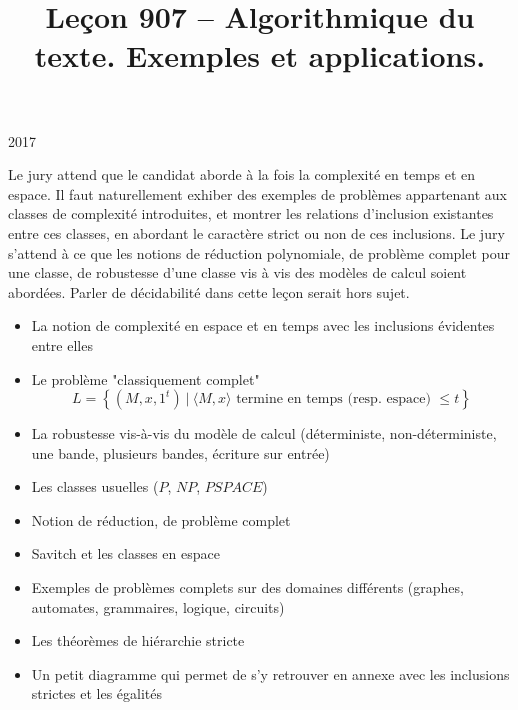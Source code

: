\documentclass{agregfiche}
\title{Leçon 907 -- Algorithmique du texte. Exemples et applications.}
\begin{document}
\maketitle

\secrapports

\begin{rapport}{2017}

Le jury attend que le candidat aborde à la fois la complexité en temps et en
espace. Il faut naturellement exhiber des exemples de problèmes appartenant aux
classes de complexité introduites, et montrer les relations d’inclusion
existantes entre ces classes, en abordant le caractère strict ou non de ces
inclusions. Le jury s’attend à ce que les notions de réduction polynomiale, de
problème complet pour une classe, de robustesse d’une classe vis à vis des
modèles de calcul soient abordées. Parler de décidabilité dans cette leçon
serait hors sujet.

\end{rapport}

\secindispensables

\begin{itemize}
    \item La notion de complexité en espace et en temps
        avec les inclusions évidentes entre elles
    \item Le problème "classiquement complet"
        \begin{equation}
            L = \left\{ (M, x, 1^t) ~|~ \langle M, x \rangle \text{ termine en
                temps (resp. espace) }\leq t
            \right\}
        \end{equation}
    \item La robustesse vis-à-vis du modèle de calcul 
        (déterministe, non-déterministe, une bande, plusieurs 
        bandes, écriture sur entrée)
    \item Les classes usuelles ($P$, $NP$, $PSPACE$)
    \item Notion de réduction, de problème complet
    \item Savitch et les classes en espace
    \item Exemples de problèmes complets sur des 
        domaines différents (graphes, automates,
        grammaires, logique, circuits)
    \item Les théorèmes de hiérarchie stricte
    \item Un petit diagramme qui permet de s'y retrouver 
        en annexe avec les inclusions strictes et les égalités
\end{itemize}
\end{document}
